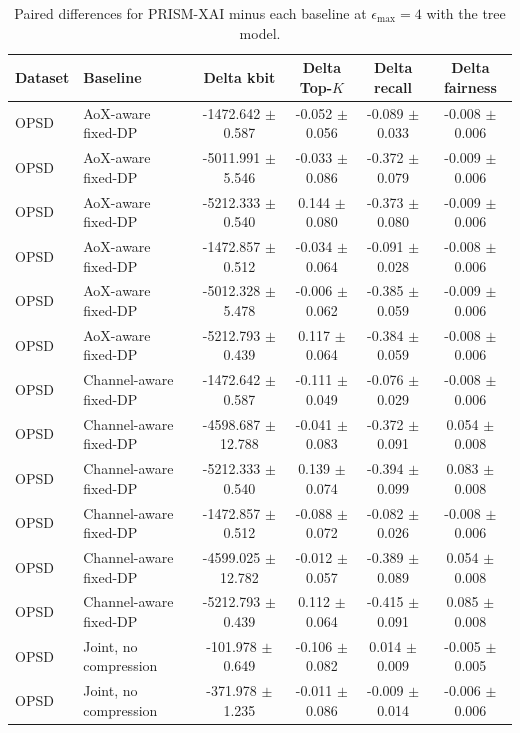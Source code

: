\begin{table}[t]
\caption{Paired differences for PRISM-XAI minus each baseline at $\epsilon_{\max}=4$ with the tree model.}
\label{tab:paired-differences}
\centering
\scriptsize
\setlength{\tabcolsep}{3pt}
\begin{tabular}{llcccc}
\toprule
Dataset & Baseline & Delta kbit & Delta Top-$K$ & Delta recall & Delta fairness \\
\midrule
OPSD & AoX-aware fixed-DP & -1472.642 $\pm$ 0.587 & -0.052 $\pm$ 0.056 & -0.089 $\pm$ 0.033 & -0.008 $\pm$ 0.006 \\
OPSD & AoX-aware fixed-DP & -5011.991 $\pm$ 5.546 & -0.033 $\pm$ 0.086 & -0.372 $\pm$ 0.079 & -0.009 $\pm$ 0.006 \\
OPSD & AoX-aware fixed-DP & -5212.333 $\pm$ 0.540 & 0.144 $\pm$ 0.080 & -0.373 $\pm$ 0.080 & -0.009 $\pm$ 0.006 \\
OPSD & AoX-aware fixed-DP & -1472.857 $\pm$ 0.512 & -0.034 $\pm$ 0.064 & -0.091 $\pm$ 0.028 & -0.008 $\pm$ 0.006 \\
OPSD & AoX-aware fixed-DP & -5012.328 $\pm$ 5.478 & -0.006 $\pm$ 0.062 & -0.385 $\pm$ 0.059 & -0.009 $\pm$ 0.006 \\
OPSD & AoX-aware fixed-DP & -5212.793 $\pm$ 0.439 & 0.117 $\pm$ 0.064 & -0.384 $\pm$ 0.059 & -0.008 $\pm$ 0.006 \\
OPSD & Channel-aware fixed-DP & -1472.642 $\pm$ 0.587 & -0.111 $\pm$ 0.049 & -0.076 $\pm$ 0.029 & -0.008 $\pm$ 0.006 \\
OPSD & Channel-aware fixed-DP & -4598.687 $\pm$ 12.788 & -0.041 $\pm$ 0.083 & -0.372 $\pm$ 0.091 & 0.054 $\pm$ 0.008 \\
OPSD & Channel-aware fixed-DP & -5212.333 $\pm$ 0.540 & 0.139 $\pm$ 0.074 & -0.394 $\pm$ 0.099 & 0.083 $\pm$ 0.008 \\
OPSD & Channel-aware fixed-DP & -1472.857 $\pm$ 0.512 & -0.088 $\pm$ 0.072 & -0.082 $\pm$ 0.026 & -0.008 $\pm$ 0.006 \\
OPSD & Channel-aware fixed-DP & -4599.025 $\pm$ 12.782 & -0.012 $\pm$ 0.057 & -0.389 $\pm$ 0.089 & 0.054 $\pm$ 0.008 \\
OPSD & Channel-aware fixed-DP & -5212.793 $\pm$ 0.439 & 0.112 $\pm$ 0.064 & -0.415 $\pm$ 0.091 & 0.085 $\pm$ 0.008 \\
OPSD & Joint, no compression & -101.978 $\pm$ 0.649 & -0.106 $\pm$ 0.082 & 0.014 $\pm$ 0.009 & -0.005 $\pm$ 0.005 \\
OPSD & Joint, no compression & -371.978 $\pm$ 1.235 & -0.011 $\pm$ 0.086 & -0.009 $\pm$ 0.014 & -0.006 $\pm$ 0.006 \\

\end{tabular}
\end{table}
